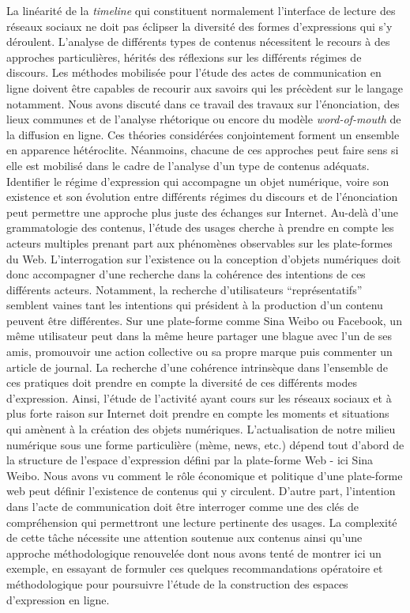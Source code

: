 La linéarité de la \textit{timeline} qui constituent normalement l'interface de lecture des réseaux sociaux ne doit pas éclipser la diversité des formes d'expressions qui s'y déroulent. L'analyse de différents types de contenus nécessitent le recours à des approches particulières, hérités des réflexions sur les différents régimes de discours. Les méthodes mobilisée pour l'étude des actes de communication en ligne doivent être capables de recourir aux savoirs qui les précèdent sur le langage notamment. Nous avons discuté dans ce travail des travaux sur l'énonciation, des lieux communes et de l'analyse rhétorique ou encore du modèle \textit{word-of-mouth} de la diffusion en ligne. Ces théories considérées conjointement forment un ensemble en apparence hétéroclite. Néanmoins, chacune de ces approches peut faire sens si elle est mobilisé dans le cadre de l'analyse d'un type de contenus adéquats. Identifier le régime d'expression qui accompagne un objet numérique, voire son existence et son évolution entre différents régimes du discours et de l'énonciation peut permettre une approche plus juste des échanges sur Internet. Au-delà d'une grammatologie des contenus, l'étude des usages cherche à prendre en compte les acteurs multiples prenant part aux phénomènes observables sur les plate-formes du Web. L'interrogation sur l'existence ou la conception d'objets numériques doit donc accompagner d'une recherche dans la cohérence des intentions de ces différents acteurs. Notamment, la recherche d'utilisateurs ``représentatifs'' semblent vaines tant les intentions qui président à la production d'un contenu peuvent être différentes. Sur une plate-forme comme Sina Weibo ou Facebook, un même utilisateur peut dans la même heure partager une blague avec l'un de ses amis, promouvoir une action collective ou sa propre marque puis commenter un article de journal. La recherche d'une cohérence intrinsèque dans l'ensemble de ces pratiques doit prendre en compte la diversité de ces différents modes d'expression. Ainsi, l'étude de l'activité ayant cours sur les réseaux sociaux et à plus forte raison sur Internet doit prendre en compte les moments et situations qui amènent à la création des objets numériques. L'actualisation de notre milieu numérique sous une forme particulière (mème, news, etc.) dépend tout d'abord de la structure de l'espace d'expression défini par la plate-forme Web - ici Sina Weibo. Nous avons vu comment le rôle économique et politique d'une plate-forme web peut définir l'existence de contenus qui y circulent. D'autre part, l'intention dans l'acte de communication doit être interroger comme une des clés de compréhension qui permettront une lecture pertinente des usages. La complexité de cette tâche nécessite une attention soutenue aux contenus ainsi qu'une approche méthodologique renouvelée dont nous avons tenté de montrer ici un exemple, en essayant de formuler ces quelques recommandations opératoire et méthodologique pour poursuivre l'étude de la construction des espaces d'expression en ligne.

